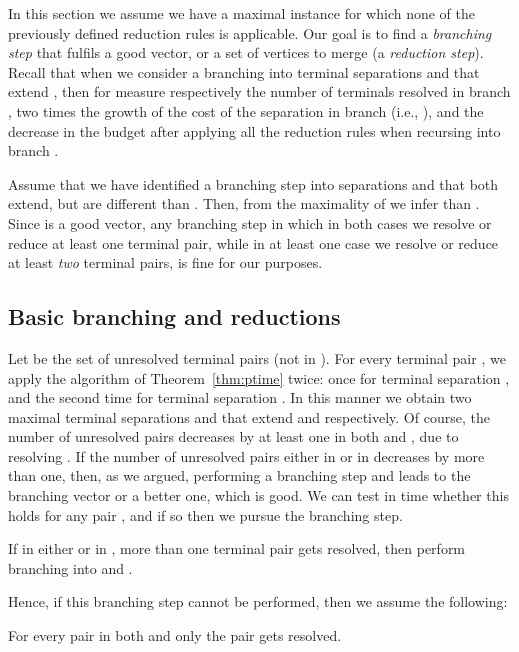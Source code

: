In this section we assume we have a maximal instance  for which none of the previously defined reduction rules is applicable.
Our goal is to find a {\em{branching step}} that fulfils a good vector,
or a set of vertices to merge (a {\em{reduction step}}). Recall that when we consider a branching into terminal separations  and  that extend , then  for  measure respectively the number of terminals resolved in branch , two times the growth of the cost of the separation in branch  (i.e., ), and the decrease in the budget  after applying all the reduction rules when recursing into branch .

Assume that we have identified a branching step into separations
 and  that both extend, but are different than
. Then, from the maximality of  we infer than
.
Since  is a good vector, any branching step
in which in both cases we resolve or reduce at least one terminal pair,
while in at least one case we resolve or reduce at least \emph{two} terminal
pairs, is fine for our purposes. 

\subsection{Basic branching and reductions}

Let  be the set of unresolved terminal pairs (not in ). For every terminal pair , we apply the algorithm of Theorem~\ref{thm:ptime} twice: once for terminal separation , and the second time for terminal separation . In this manner we obtain two maximal terminal separations  and  that extend  and  respectively. Of course, the number of unresolved pairs decreases by at least one in both  and , due to resolving . If the number of unresolved pairs either in  or in  decreases by more than one, then, as we argued, performing a branching step  and  leads to the branching vector  or a better one, which is good. We can test in  time whether this holds for any pair , and if so then we pursue the branching step. 

\begin{branching}\label{br:twopairs}
If in either  or in , more than one terminal pair gets resolved, then perform branching into  and .
\end{branching}

Hence, if this branching step cannot be performed, then we assume the following:

\begin{assumption}\label{ass:one-pair}
For every pair  in both  and  only the pair  gets resolved.
\end{assumption}


